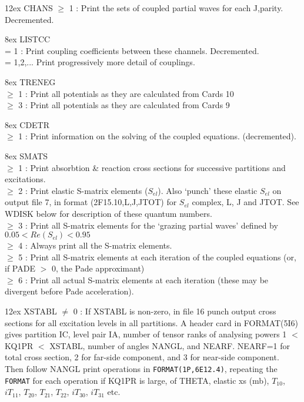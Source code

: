 \documentclass[11pt]{article}
\begin{document}
\hangindent 12ex
CHANS  $\geq$ 1 : Print the sets of coupled partial waves for each J,parity.
Decremented.

\hangindent 8ex  LISTCC
\\  = 1 : Print coupling coefficients between these channels. Decremented.
\\  = 1,2,... Print progressively more detail of couplings.



\hangindent 8ex  TRENEG
\\  $\geq$ 1 : Print all potentials as they are calculated from Cards 10
\\  $\geq$ 3 : Print all potentials as they are calculated from Cards 9



\hangindent 8ex  CDETR
\\  $\geq$ 1 : Print information on the solving of the coupled equations.
(decremented).

\hangindent 8ex
SMATS
\\  $\geq$ 1 : Print absorbtion \& reaction cross sections for successive
partitions and excitations.
\\  $\geq$ 2 : Print elastic S-matrix elements ($S_{el}$).
Also `punch' these elastic $S_{el}$ on output file 7,
in format (2F15.10,L,J,JTOT) for $S_{el}$ complex, L, J and JTOT.
See WDISK below for description of these quantum numbers.
\\  $\geq$ 3 : Print all S-matrix elements for the `grazing partial waves'
defined by $0.05 < Re(S_{el}) < 0.95$
\\  $\geq$ 4 : Always print all the S-matrix elements.
\\  $\geq$ 5 : Print all S-matrix elements at each iteration of the coupled
equations (or, if PADE  $>$ 0, the Pade approximant)
\\  $\geq$ 6 : Print all actual S-matrix elements at each iteration (these
may be divergent before Pade acceleration).





\hangindent 12ex
XSTABL $\neq$ 0 : If XSTABL is non-zero, in file 16 punch output cross sections
for all excitation levels in all partitions.
A header card in FORMAT(5I6) gives partition IC, level pair IA,
number of tensor ranks of analysing powers 1 $<$ KQ1PR $<$ XSTABL,
number of angles NANGL, and NEARF.  NEARF=1 for total cross section,
2 for far-side component, and 3 for near-side component.
\\
Then follow NANGL print operations in
{\tt FORMAT(1P,6E12.4)}, repeating
the {\tt FORMAT} for each operation if KQ1PR is large,
of THETA, elastic xs (mb), $T_{10}$, $iT_{11}$,
$T_{20}$, $ T_{21}$, $ T_{22}$, $ iT_{30}$, $ iT_{31}$
etc.
\end{document}
